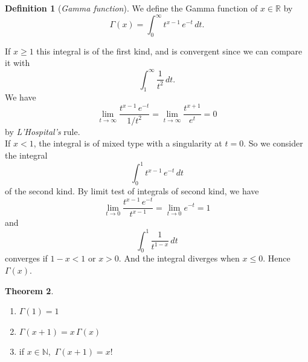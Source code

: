 \documentclass[12pt,a4paper]{report}
\theoremstyle{definition}
\newtheorem{thm}{Theorem}[section]
\newtheorem{defn}[thm]{Definition}
\theoremstyle{plain}
\begin{document}
\begin{defn}[\textit{Gamma function}]
We define the Gamma function of $x\in \mathbb{R}$ by $$\Gamma(x) = \int_0^{\infty} t^{x-1}\, e^{-t}\, dt.$$
\end{defn}

If $x\geq 1$ this integral is of the first kind, and is convergent since we can compare it with $$\int_1^{\infty} \frac{1}{t^2}\, dt.$$
We have 
$$\lim_{t\rightarrow \infty} \frac{t^{x-1}\, e^{-t}}{1/t^2} = \lim_{t\rightarrow \infty} \frac{t^{x+1}}{e^t} = 0$$
by \textit{L'Hospital's} rule.\\
If $x <1$, the integral is of mixed type with a singularity at $t = 0$. So we consider the integral $$\int_0^1t^{x-1}\, e^{-t}\, dt$$ of the second kind. By limit test of integrals of second kind, we have
$$\lim_{t\rightarrow 0} \frac{t^{x -1}\, e^{-t}}{t^{x - 1}} = \lim_{t\rightarrow 0} e^{-t} = 1$$ and $$\int_0^1\frac{1}{t^{1-x}}\, dt$$ converges if $1-x < 1$ or $x>0$. And the integral diverges when $x \leq 0$. Hence $\Gamma(x)$.








\begin{thm}\textbf{}
\vspace*{-5mm}
\begin{enumerate}
\item[(a).] $\Gamma(1) = 1$
\item[(b).] $\Gamma(x + 1) = x\, \Gamma(x)$
\item[(c).] if $x\in \mathbb{N}$, $\, \Gamma(x + 1) = x!$
\end{enumerate}
\end{thm}
\end{document}
